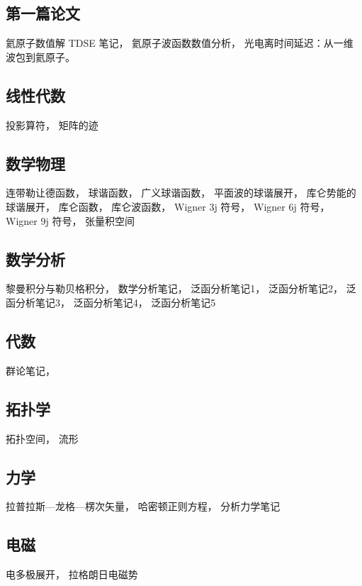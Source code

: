 
\subsection{第一篇论文}
氦原子数值解 TDSE 笔记， 氦原子波函数数值分析， 光电离时间延迟：从一维波包到氦原子。

\subsection{线性代数}
投影算符， 矩阵的迹

\subsection{数学物理}
连带勒让德函数， 球谐函数， 广义球谐函数， 平面波的球谐展开， 库仑势能的球谐展开， 库仑函数， 库仑波函数， Wigner 3j 符号， Wigner 6j 符号， Wigner 9j 符号， 张量积空间

\subsection{数学分析}
黎曼积分与勒贝格积分， 数学分析笔记， 泛函分析笔记1， 泛函分析笔记2， 泛函分析笔记3， 泛函分析笔记4， 泛函分析笔记5

\subsection{代数}
群论笔记，

\subsection{拓扑学}
拓扑空间， 流形

\subsection{力学}
拉普拉斯—龙格—楞次矢量， 哈密顿正则方程， 分析力学笔记

\subsection{电磁}
电多极展开， 拉格朗日电磁势

